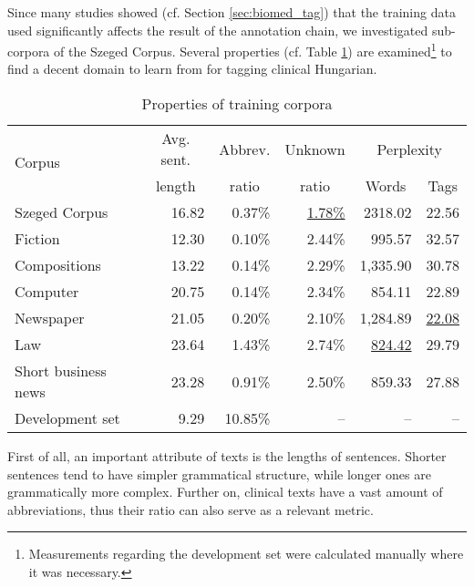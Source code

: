 Since many studies showed (cf. Section \ref{sec:biomed_tag}) that the training data used significantly affects the result of the annotation chain, we investigated sub-corpora of the Szeged Corpus. 
Several properties (cf. Table \ref{tab:subcorpora_attrib}) are  examined\footnote{Measurements regarding the development set were calculated manually where it was necessary.} to find a decent domain to learn from for tagging clinical Hungarian. 

\begin{table}[H]
\centering
\caption{Properties of training corpora}
\label{tab:subcorpora_attrib}
\begin{tabular}{ l r r r r r } 
\hline
\multicolumn{1}{l}{\multirow{2}{*}{Corpus}} & \multicolumn{1}{c}{Avg. sent.} & \multicolumn{1}{c}{Abbrev.}  &  \multicolumn{1}{c}{Unknown} & \multicolumn{2}{c}{Perplexity} \\
 & \multicolumn{1}{c}{length} & \multicolumn{1}{c}{ratio} &  \multicolumn{1}{c}{ratio} & \multicolumn{1}{c}{Words} & \multicolumn{1}{c}{Tags} \\
\hline
Szeged Corpus & 16.82 & 0.37\%  & \underline{1.78\%} & 2318.02 & 22.56\\
\hspace{0.2cm} Fiction & 12.30 & 0.10\% & 2.44\% & 995.57 & 32.57\\
\hspace{0.2cm} Compositions & 13.22 & 0.14\% & 2.29\% & 1,335.90 & 30.78\\
\hspace{0.2cm} Computer & 20.75 & 0.14\% & 2.34\% & 854.11 & 22.89\\
\hspace{0.2cm} Newspaper & 21.05 & 0.20\% & 2.10\% & 1,284.89 & \underline{22.08}\\
\hspace{0.2cm} Law & 23.64 & 1.43\% & 2.74\% & \underline{824.42} & 29.79\\
\hspace{0.2cm} Short business news & 23.28 & 0.91\% & 2.50\% & 859.33 & 27.88\\
Development set & 9.29 & 10.85\% & -- & -- & -- \\
\hline
\end{tabular}
\end{table}

First of all, an important attribute of texts is the lengths of sentences. 
Shorter sentences tend to have simpler grammatical structure, while longer ones are grammatically more complex. 
Further on, clinical texts have a vast amount of abbreviations, thus their ratio can also serve as a relevant metric. 

